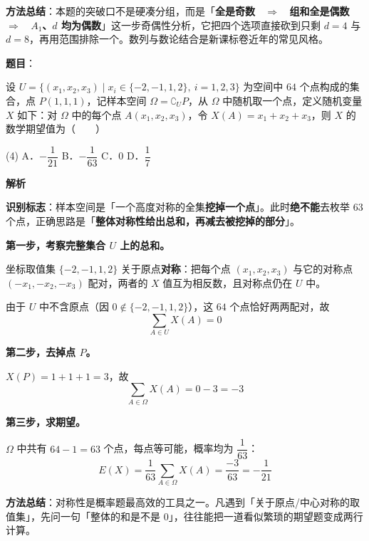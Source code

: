 \begin{answer}
\begin{gktip}
\textbf{方法总结}：本题的突破口不是硬凑分组，而是「\textbf{全是奇数 ~$\Longrightarrow$~ 组和全是偶数 ~$\Longrightarrow$~ $A_1$、$d$ 均为偶数}」这一步奇偶性分析，它把四个选项直接砍到只剩 $d=4$ 与 $d=8$，再用范围排除一个。数列与数论结合是新课标卷近年的常见风格。
\end{gktip}


\par\medskip

\end{answer}
\begin{answer}

\textbf{题目}：

设 $U=\{(x_1,x_2,x_3)\mid x_i\in\{-2,-1,1,2\},\ i=1,2,3\}$ 为空间中 $64$ 个点构成的集合，点 $P(1,1,1)$，记样本空间 $\Omega=\complement_U P$，从 $\Omega$ 中随机取一个点，定义随机变量 $X$ 如下：对 $\Omega$ 中的每个点 $A(x_1,x_2,x_3)$，令 $X(A)=x_1+x_2+x_3$，则 $X$ 的数学期望值为\mbox{（　　）}

\begin{gkopts}(4)
\task A．$-\dfrac{1}{21}$
\task B．$-\dfrac{1}{63}$
\task C．$0$
\task D．$\dfrac{1}{7}$
\end{gkopts}

\textbf{解析}

\textbf{识别标志}：样本空间是「一个高度对称的全集\textbf{挖掉一个点}」。此时\textbf{绝不能}去枚举 $63$ 个点，正确思路是「\textbf{整体对称性给出总和，再减去被挖掉的部分}」。

\textbf{第一步，考察完整集合 $U$ 上的总和。}

坐标取值集 $\{-2,-1,1,2\}$ 关于原点\textbf{对称}：把每个点 $(x_1,x_2,x_3)$ 与它的对称点 $(-x_1,-x_2,-x_3)$ 配对，两者的 $X$ 值互为相反数，且对称点仍在 $U$ 中。

由于 $U$ 中不含原点（因 $0\notin\{-2,-1,1,2\}$），这 $64$ 个点恰好两两配对，故
\nopagebreak[4]
\[\sum_{A\in U}X(A)=0\]

\textbf{第二步，去掉点 $P$。}

$X(P)=1+1+1=3$，故
\nopagebreak[4]
\[\sum_{A\in\Omega}X(A)=0-3=-3\]

\textbf{第三步，求期望。}

$\Omega$ 中共有 $64-1=63$ 个点，每点等可能，概率均为 $\dfrac1{63}$：
\nopagebreak[4]
\[E(X)=\frac{1}{63}\sum_{A\in\Omega}X(A)=\frac{-3}{63}=-\frac{1}{21}\]

\begin{gktip}
\textbf{方法总结}：对称性是概率题最高效的工具之一。凡遇到「关于原点/中心对称的取值集」，先问一句「整体的和是不是 $0$」，往往能把一道看似繁琐的期望题变成两行计算。
\end{gktip}


\par\medskip

\end{answer}

